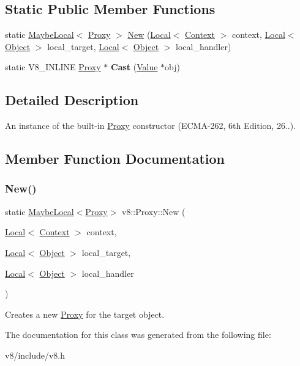 \subsection*{Static Public Member Functions}
\begin{DoxyCompactItemize}
\item 
static \mbox{\hyperlink{classv8_1_1MaybeLocal}{Maybe\+Local}}$<$ \mbox{\hyperlink{classv8_1_1Proxy}{Proxy}} $>$ \mbox{\hyperlink{classv8_1_1Proxy_ab58d9d98f17d299ca7a487d05e771260}{New}} (\mbox{\hyperlink{classv8_1_1Local}{Local}}$<$ \mbox{\hyperlink{classv8_1_1Context}{Context}} $>$ context, \mbox{\hyperlink{classv8_1_1Local}{Local}}$<$ \mbox{\hyperlink{classv8_1_1Object}{Object}} $>$ local\+\_\+target, \mbox{\hyperlink{classv8_1_1Local}{Local}}$<$ \mbox{\hyperlink{classv8_1_1Object}{Object}} $>$ local\+\_\+handler)
\item 
\mbox{\label{classv8_1_1Proxy_a6562478fdedab6fa0fe20ede066b2a78}} 
static V8\+\_\+\+I\+N\+L\+I\+NE \mbox{\hyperlink{classv8_1_1Proxy}{Proxy}} $\ast$ {\bfseries Cast} (\mbox{\hyperlink{classv8_1_1Value}{Value}} $\ast$obj)
\end{DoxyCompactItemize}


\subsection{Detailed Description}
An instance of the built-\/in \mbox{\hyperlink{classv8_1_1Proxy}{Proxy}} constructor (E\+C\+M\+A-\/262, 6th Edition, 26..). 

\subsection{Member Function Documentation}
\mbox{\label{classv8_1_1Proxy_ab58d9d98f17d299ca7a487d05e771260}} 
\subsubsection{\texorpdfstring{New()}{New()}}
{\footnotesize\ttfamily static \mbox{\hyperlink{classv8_1_1MaybeLocal}{Maybe\+Local}}$<$\mbox{\hyperlink{classv8_1_1Proxy}{Proxy}}$>$ v8\+::\+Proxy\+::\+New (\begin{DoxyParamCaption}\item[{\mbox{\hyperlink{classv8_1_1Local}{Local}}$<$ \mbox{\hyperlink{classv8_1_1Context}{Context}} $>$}]{context,  }\item[{\mbox{\hyperlink{classv8_1_1Local}{Local}}$<$ \mbox{\hyperlink{classv8_1_1Object}{Object}} $>$}]{local\+\_\+target,  }\item[{\mbox{\hyperlink{classv8_1_1Local}{Local}}$<$ \mbox{\hyperlink{classv8_1_1Object}{Object}} $>$}]{local\+\_\+handler }\end{DoxyParamCaption})\hspace{0.3cm}{\ttfamily [static]}}

Creates a new \mbox{\hyperlink{classv8_1_1Proxy}{Proxy}} for the target object. 

The documentation for this class was generated from the following file\+:\begin{DoxyCompactItemize}
\item 
v8/include/v8.\+h\end{DoxyCompactItemize}
